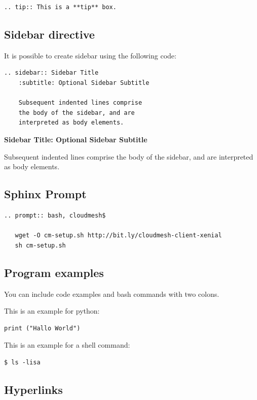 \begin{verbatim}
.. tip:: This is a **tip** box.
\end{verbatim}

\subsection{Sidebar directive}\label{sidebar-directive}

It is possible to create sidebar using the following code:

\begin{verbatim}
.. sidebar:: Sidebar Title
    :subtitle: Optional Sidebar Subtitle

    Subsequent indented lines comprise
    the body of the sidebar, and are
    interpreted as body elements.
\end{verbatim}

\textbf{Sidebar Title: Optional Sidebar Subtitle}

Subsequent indented lines comprise the body of the sidebar, and are
interpreted as body elements.

\subsection{Sphinx Prompt}\label{sphinx-prompt}

\begin{verbatim}
.. prompt:: bash, cloudmesh$

   wget -O cm-setup.sh http://bit.ly/cloudmesh-client-xenial
   sh cm-setup.sh
\end{verbatim}

\subsection{Program examples}\label{program-examples}

You can include code examples and bash commands with two colons.

This is an example for python:

\begin{verbatim}
print ("Hallo World")
\end{verbatim}

This is an example for a shell command:

\begin{verbatim}
$ ls -lisa
\end{verbatim}

\subsection{Hyperlinks}\label{hyperlinks}

